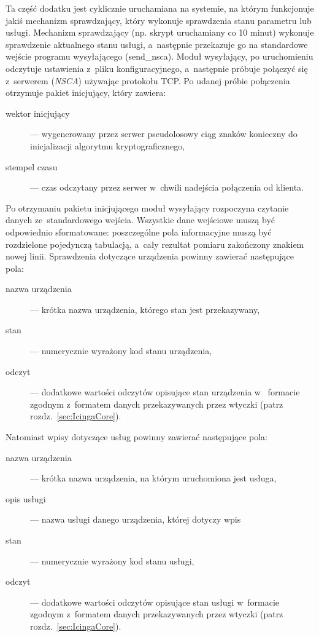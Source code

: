 Ta część dodatku jest cyklicznie uruchamiana na systemie, na którym
funkcjonuje jakiś mechanizm sprawdzający, który wykonuje sprawdzenia
stanu parametru lub usługi. Mechanizm sprawdzający (np. skrypt
uruchamiany co 10 minut) wykonuje sprawdzenie aktualnego stanu usługi,
a~następnie przekazuje go na standardowe wejście programu
wysyłającego (send\_nsca). Moduł wysyłający, po uruchomieniu
odczytuje ustawienia z~pliku konfiguracyjnego, a~następnie próbuje
połączyć się z~serwerem ({\em NSCA}) używając protokołu TCP. Po udanej
próbie połączenia otrzymuje pakiet inicjujący, który zawiera:

\begin{description}
\item[wektor inicjujący] --- wygenerowany przez serwer pseudolosowy ciąg
  znaków konieczny do inicjalizacji algorytmu kryptograficznego,
\item[stempel czasu] --- czas odczytany przez serwer w~chwili nadejścia
  połączenia od klienta.
\end{description} 

Po otrzymaniu pakietu inicjującego moduł wysyłający rozpoczyna
czytanie danych ze~standardowego wejścia. Wszystkie dane wejściowe
muszą być odpowiednio sformatowane: poszczególne pola informacyjne
muszą być rozdzielone pojedynczą tabulacją, a~cały rezultat pomiaru
zakończony znakiem nowej linii. Sprawdzenia dotyczące urządzenia
powinny zawierać następujące pola:

\begin{description}
\item[nazwa urządzenia] --- krótka nazwa urządzenia, którego stan jest
  przekazywany,
\item[stan] --- numerycznie wyrażony kod stanu urządzenia,
\item[odczyt] --- dodatkowe wartości odczytów opisujące stan
  urządzenia w~ formacie zgodnym z~formatem danych przekazywanych
  przez wtyczki (patrz rozdz.~\ref{sec:IcingaCore}).
\end{description}

Natomiast wpisy dotyczące usług powinny zawierać następujące pola:

\begin{description}
\item[nazwa urządzenia] --- krótka nazwa urządzenia, na którym uruchomiona
  jest usługa,
\item[opis usługi] --- nazwa usługi danego urządzenia, której dotyczy wpis
\item[stan] --- numerycznie wyrażony kod stanu usługi,
\item[odczyt] --- dodatkowe wartości odczytów opisujące stan usługi
  w~formacie zgodnym z~formatem danych przekazywanych przez wtyczki
  (patrz rozdz.~\ref{sec:IcingaCore}).
\end{description}

